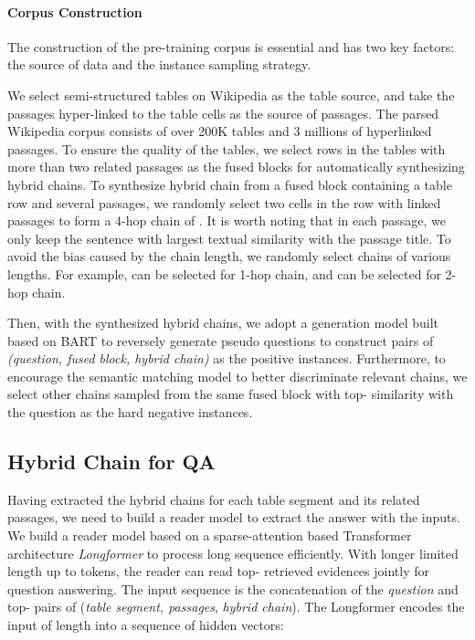 \documentclass[11pt]{article}
\begin{document}
	\paragraph{Corpus Construction}
	
	The construction of the pre-training corpus is essential and has two key factors: the source of data and the instance sampling strategy.
	
	We select semi-structured tables on Wikipedia as the table source, and take the passages hyper-linked to the table cells as the source of passages. 
	The parsed Wikipedia corpus consists of over 200K tables and 3 millions of hyperlinked passages. To ensure the quality of the tables, we select rows in the tables with more than two related passages as the fused blocks for automatically synthesizing hybrid chains.
	To synthesize hybrid chain from a fused block containing a table row and several passages, we randomly select two cells in the row with linked passages to form a 4-hop chain of . It is worth noting that in each passage, we only keep the sentence with largest textual similarity with the passage title. 
	To avoid the bias caused by the chain length, we randomly select chains of various lengths. For example,  can be selected for 1-hop chain, and  can be selected for 2-hop chain. 
	
	Then, with the synthesized hybrid chains, we adopt a generation model built based on BART \cite{lewis2019bart} to reversely generate pseudo questions to construct pairs of \textit{(question, fused block, hybrid chain)} as the positive instances. 
	Furthermore, to encourage the semantic matching model to better discriminate relevant chains, we select other chains sampled from the same fused block with top- similarity with the question as the hard negative instances. 
\fi
	\subsection{Hybrid Chain for QA}
	\label{sec:qa}
	Having extracted the hybrid chains for each table segment and its related passages, we need to build a reader model to extract the answer  with the inputs.
	We build a reader model based on a sparse-attention based Transformer architecture \textit{Longformer} \cite{beltagy2020longformer} to process long sequence efficiently.
	With longer limited length up to  tokens, the reader can read top- retrieved evidences jointly for question answering.
	The input sequence  is the concatenation of the \textit{question} and top- pairs of (\textit{table segment, passages}, \textit{hybrid chain}).
	The Longformer encodes the input  of length  into a sequence of hidden vectors:
	
\end{document}
